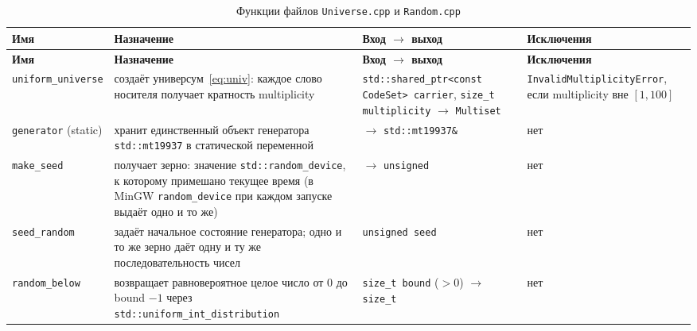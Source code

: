 \documentclass[14pt,a4paper]{extarticle}
\newcommand{\code}[1]{\texttt{#1}}
\newcommand{\us}{\_\allowbreak{}}
\begin{document}
{\begin{longtable}{|P{3.4cm}|P{5.0cm}|P{4.5cm}|P{2.5cm}|}
\caption{Функции файлов \code{Universe.cpp} и \code{Random.cpp}}\label{tab:frand}\\
\hline
\textbf{Имя} & \textbf{Назначение} & \textbf{Вход $\to$ выход} & \textbf{Исключения}\\\hline
\endfirsthead
\hline
\textbf{Имя} & \textbf{Назначение} & \textbf{Вход $\to$ выход} & \textbf{Исключения}\\\hline
\endhead
\code{uniform\us{}universe} & создаёт универсум~\eqref{eq:univ}: каждое слово носителя получает кратность multiplicity & \code{std::shared\us{}ptr<const CodeSet> carrier}, \code{size\us{}t multiplicity} $\to$ \code{Multiset} & \code{Invalid\allowbreak{}Multiplicity\allowbreak{}Error}, если multiplicity вне $[1, 100]$ \\\hline
\code{generator} (static) & хранит единственный объект генератора \code{std::mt19937} в статической переменной & $\to$ \code{std::mt19937\&} & нет \\\hline
\code{make\us{}seed} & получает зерно: значение \code{std::random\us{}device}, к которому примешано текущее время (в MinGW \code{random\us{}device} при каждом запуске выдаёт одно и то же) & $\to$ \code{unsigned} & нет \\\hline
\code{seed\us{}random} & задаёт начальное состояние генератора; одно и то же зерно даёт одну и ту же последовательность чисел & \code{unsigned seed} & нет \\\hline
\code{random\us{}below} & возвращает равновероятное целое число от 0 до bound $- 1$ через \code{std::uniform\us{}int\us{}distribution} & \code{size\us{}t bound} ($> 0$) $\to$ \code{size\us{}t} & нет \\\hline
\end{longtable}

}
\end{document}
